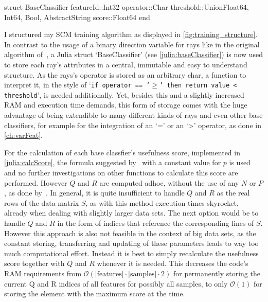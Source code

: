 \begin{jllisting}[caption={Storing base classifiers as structs.}, label={julia:baseClassifier}]
    struct BaseClassifier
        featureId::Int32
        operator::Char
        threshold::Union{Float64, Int64, Bool, AbstractString}
        score::Float64
    end
\end{jllisting}

I structured my SCM training algorithm as displayed in \autoref{fig:training_structure}.
In contrast to the usage of a binary direction variable for rays like in the original algorithm of~\cite{marchand02}, a Julia struct `BaseClassifier' (see \autoref{julia:baseClassifier})
is now used to store each ray's attributes in a central, immutable and easy to understand structure.
As the rays's operator is stored as an arbitrary char, a function to interpret it, in the style of `\texttt{if operator == '\(\geq\)' then return value < threshold}', is needed additionally.
Yet, besides this and a slightly increased RAM and execution time demands, this form of storage comes with the huge advantage of being extendible to many different kinds 
of rays and even other base classifiers, for example for the integration of an `=' or an `>' operator, as done in \autoref{ch:varFeat}.

For the calculation of each base classfier's usefulness score, implemented in \autoref{julia:calcScore}, 
the formula suggested by~\cite{marchand02} with a constant value for \(p\) is used and
no further investigations on other functions to calculate this score are performed.
However \(Q\) and \(R\) are computed adhoc, without the use of any \(N\) or \(P\), as done by~\cite{marchand02}.
In general, it is quite insufficient to handle \(Q\) and \(R\) as the real rows of the data matrix \(S\), as with this
method execution times skyrocket, already when dealing with slightly larger data sets.
The next option would be to handle \(Q\) and \(R\) in the form of indices that reference the corresponding lines of \(S\).
However this approach is also not feasible in the context of big data sets, as the constant storing,
transferring and updating of these parameters leads to way too much computational effort.
Instead it is best to simply recalculate the usefulness score together with \(Q\) and \(R\) whenever it is needed.
This decreases the code's RAM requirements from \(\mathcal{O}(|\text{features}| \cdot |\text{samples}| \cdot 2)\) for permanently storing the current Q and R indices
of all features for possibly all samples, to only \(\mathcal{O}(1)\) for storing the element with the maximum score at the time.

